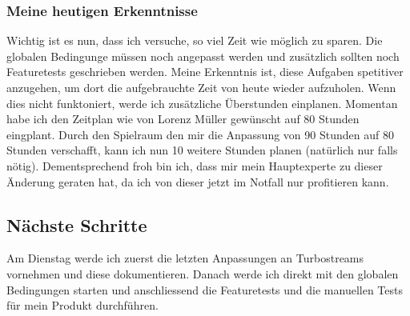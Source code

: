 \subsubsection*{Meine heutigen Erkenntnisse}
Wichtig ist es nun, dass ich versuche, so viel Zeit wie möglich zu sparen. Die globalen Bedingunge müssen noch angepasst werden und
zusätzlich sollten noch Featuretests geschrieben werden. Meine Erkenntnis ist, diese Aufgaben spetitiver anzugehen, um dort die 
aufgebrauchte Zeit von heute wieder aufzuholen. Wenn dies nicht funktoniert, werde ich zusätzliche Überstunden einplanen. Momentan habe ich den Zeitplan
wie von Lorenz Müller gewünscht auf 80 Stunden eingplant. Durch den Spielraum den mir die Anpassung von 90 Stunden auf 80 Stunden verschafft, kann ich
nun 10 weitere Stunden planen (natürlich nur falls nötig). Dementsprechend froh bin ich, dass mir mein Hauptexperte zu dieser Änderung geraten hat, 
da ich von dieser jetzt im Notfall nur profitieren kann.

\subsection*{Nächste Schritte}
Am Dienstag werde ich zuerst die letzten Anpassungen an Turbostreams vornehmen und diese dokumentieren. Danach
werde ich direkt mit den globalen Bedingungen starten und anschliessend die Featuretests und die manuellen Tests für mein
Produkt durchführen.

\pagebreak
